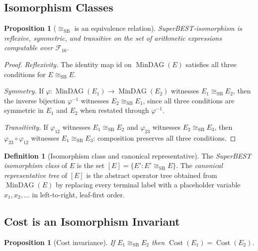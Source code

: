 \documentclass[12pt,a4paper]{article}
\newtheorem{proposition}[theorem]{Proposition}
\theoremstyle{definition}
\newtheorem{definition}[theorem]{Definition}
\newcommand{\Cost}{\operatorname{Cost}}
\newcommand{\MinDAG}{\operatorname{MinDAG}}
\newcommand{\siso}{\cong_{\mathrm{SB}}}
\begin{document}
\subsection{Isomorphism Classes}

\begin{proposition}[$\siso$ is an equivalence relation]
\label{prop:equiv}
SuperBEST-isomorphism is reflexive, symmetric, and transitive on the set of
arithmetic expressions computable over $\mathcal{F}_{16}$.
\end{proposition}

\begin{proof}
\textit{Reflexivity.} The identity map $\mathrm{id}$ on $\MinDAG(E)$ satisfies
all three conditions for $E \siso E$.

\textit{Symmetry.} If $\varphi\colon \MinDAG(E_1) \to \MinDAG(E_2)$ witnesses
$E_1 \siso E_2$, then the inverse bijection $\varphi^{-1}$ witnesses
$E_2 \siso E_1$, since all three conditions are symmetric in $E_1$ and $E_2$
when restated through $\varphi^{-1}$.

\textit{Transitivity.} If $\varphi_{12}$ witnesses $E_1 \siso E_2$ and
$\varphi_{23}$ witnesses $E_2 \siso E_3$, then
$\varphi_{23} \circ \varphi_{12}$ witnesses $E_1 \siso E_3$: composition
preserves all three conditions.
\end{proof}

\begin{definition}[Isomorphism class and canonical representative]
\label{def:class}
The \emph{SuperBEST isomorphism class} of $E$ is the set
$[E] = \{E' : E' \siso E\}$.  The \emph{canonical representative tree} of
$[E]$ is the abstract operator tree obtained from $\MinDAG(E)$ by replacing
every terminal label with a placeholder variable $x_1, x_2, \ldots$
in left-to-right, leaf-first order.
\end{definition}

\subsection{Cost is an Isomorphism Invariant}

\begin{proposition}[Cost invariance]
\label{prop:cost-inv}
If $E_1 \siso E_2$ then $\Cost(E_1) = \Cost(E_2)$.
\end{proposition}
\end{document}
